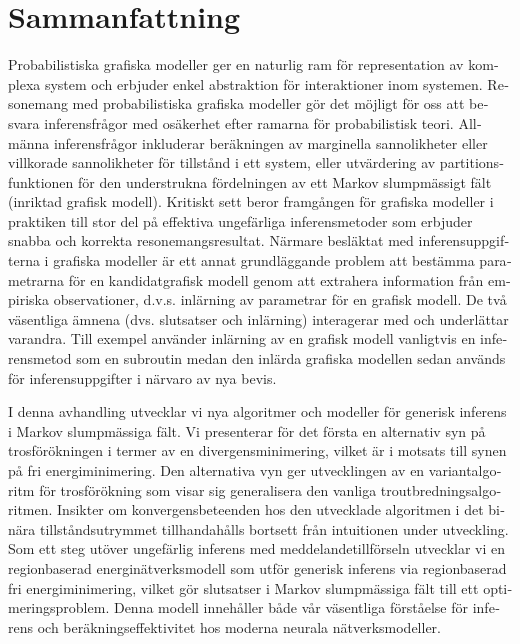 \chapter{Sammanfattning}

\begin{otherlanguage}{swedish}
  Probabilistiska grafiska modeller ger en naturlig ram för representation av komplexa system och erbjuder enkel abstraktion för interaktioner inom systemen. Resonemang med probabilistiska grafiska modeller gör det möjligt för oss att besvara inferensfrågor med osäkerhet efter ramarna för probabilistisk teori. Allmänna inferensfrågor inkluderar beräkningen av marginella sannolikheter eller villkorade sannolikheter för tillstånd i ett system, eller utvärdering av partitionsfunktionen för den understrukna fördelningen av ett Markov slumpmässigt fält (inriktad grafisk modell). Kritiskt sett beror framgången för grafiska modeller i praktiken till stor del på effektiva ungefärliga inferensmetoder som erbjuder snabba och korrekta resonemangsresultat. Närmare besläktat med inferensuppgifterna i grafiska modeller är ett annat grundläggande problem att bestämma parametrarna för en kandidatgrafisk modell genom att extrahera information från empiriska observationer, d.v.s. inlärning av parametrar för en grafisk modell. De två väsentliga ämnena (dvs. slutsatser och inlärning) interagerar med och underlättar varandra. Till exempel använder inlärning av en grafisk modell vanligtvis en inferensmetod som en subroutin medan den inlärda grafiska modellen sedan används för inferensuppgifter i närvaro av nya bevis.

  I denna avhandling utvecklar vi nya algoritmer och modeller för generisk inferens i Markov slumpmässiga fält. Vi presenterar för det första en alternativ syn på trosförökningen i termer av en divergensminimering, vilket är i motsats till synen på fri energiminimering. Den alternativa vyn ger utvecklingen av en variantalgoritm för trosförökning som visar sig generalisera den vanliga troutbredningsalgoritmen. Insikter om konvergensbeteenden hos den utvecklade algoritmen i det binära tillståndsutrymmet tillhandahålls bortsett från intuitionen under utveckling. Som ett steg utöver ungefärlig inferens med meddelandetillförseln utvecklar vi en regionbaserad energinätverksmodell som utför generisk inferens via regionbaserad fri energiminimering, vilket gör slutsatser i Markov slumpmässiga fält till ett optimeringsproblem. Denna modell innehåller både vår väsentliga förståelse för inferens och beräkningseffektivitet hos moderna neurala nätverksmodeller.


\end{otherlanguage}
